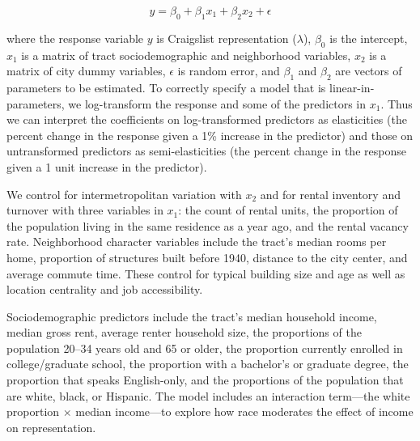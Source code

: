 \documentclass[11pt,letterpaper]{article}
\begin{document}
\begin{equation}
	\label{eq:regression_formula}
	y = \beta_0 + \beta_1 x_1 + \beta_2 x_2 + \epsilon
\end{equation}

where the response variable $y$ is Craigslist representation ($\lambda$), $\beta_0$ is the intercept, $x_1$ is a matrix of tract sociodemographic and neighborhood variables, $x_2$ is a matrix of city dummy variables, $\epsilon$ is random error, and $\beta_1$ and $\beta_2$ are vectors of parameters to be estimated. To correctly specify a model that is linear-in-parameters, we log-transform the response and some of the predictors in $x_1$. Thus we can interpret the coefficients on log-transformed predictors as elasticities (the percent change in the response given a 1\% increase in the predictor) and those on untransformed predictors as semi-elasticities (the percent change in the response given a 1 unit increase in the predictor).

We control for intermetropolitan variation with $x_2$ and for rental inventory and turnover with three variables in $x_1$: the count of rental units, the proportion of the population living in the same residence as a year ago, and the rental vacancy rate. Neighborhood character variables include the tract's median rooms per home, proportion of structures built before 1940, distance to the city center, and average commute time. These control for typical building size and age as well as location centrality and job accessibility.

Sociodemographic predictors include the tract's median household income, median gross rent, average renter household size, the proportions of the population 20--34 years old and 65 or older, the proportion currently enrolled in college/graduate school, the proportion with a bachelor's or graduate degree, the proportion that speaks English-only, and the proportions of the population that are white, black, or Hispanic. The model includes an interaction term---the white proportion $\times$ median income---to explore how race moderates the effect of income on representation.
\end{document}

